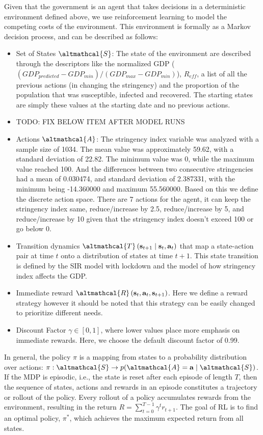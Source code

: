 \documentclass[tikz,fleqn,12pt]{wlscirep}
\begin{document}
Given that the government is an agent that takes decisions in a deterministic environment defined above, we use reinforcement learning to model the competing costs of the environment. This environment is formally as a Markov decision process, and can be described as follows:
\begin{itemize}
    \item Set of States $\altmathcal{S}$: The state of the environment are described through the descriptors like the normalized GDP ($(GDP_{predicted} - GDP_{min}) / (GDP_{max} - GDP_{min})$), $R_{eff}$, a list of all the previous actions (in changing the stringency) and the proportion of the population that was susceptible, infected and recovered. The starting states are simply these values at the starting date and no previous actions.
    \item TODO: FIX BELOW ITEM AFTER MODEL RUNS
    \item Actions $\altmathcal{A}$: The stringency index variable was analyzed with a sample size of 1034. The mean value was approximately 59.62, with a standard deviation of 22.82. The minimum value was 0, while the maximum value reached 100. And the differences between two consecutive stringencies had a mean of 0.030474, and standard deviation of 2.387331, with the minimum being -14.360000 and maximum 55.560000. Based on this we define the discrete action space. There are 7 actions for the agent, it can keep the stringency index same, reduce/increase by 2.5, reduce/increase by 5, and reduce/increase by 10 given that the stringency index doesn't exceed 100 or go below 0.
    \item Transition dynamics $\altmathcal{T}\left(\mathbf{s}_{t+1} \mid \mathbf{s}_t, \mathbf{a}_t\right)$ that map a state-action pair at time $t$ onto a distribution of states at time $t+1$. This state transition is defined by the SIR model with lockdown and the model of how stringency index affects the GDP.
    \item Immediate reward $\altmathcal{R}\left(\mathbf{s}_t, \mathbf{a}_t, \mathbf{s}_{t+1}\right)$. Here we define a reward strategy however it should be noted that this strategy can be easily changed to prioritize different needs.
    \item Discount Factor $\gamma \in[0,1]$, where lower values place more emphasis on immediate rewards. Here, we choose the default discount factor of 0.99.
\end{itemize}
In general, the policy $\pi$ is a mapping from states to a probability distribution over actions: $\pi: \altmathcal{S} \rightarrow p(\altmathcal{A}=\mathbf{a} \mid \altmathcal{S})$. If the MDP is episodic, i.e., the state is reset after each episode of length $T$, then the sequence of states, actions and rewards in an episode constitutes a trajectory or rollout of the policy. Every rollout of a policy accumulates rewards from the environment, resulting in the return $R=\sum_{t=0}^{T-1} \gamma^t r_{t+1}$. The goal of RL is to find an optimal policy, $\pi^*$, which achieves the maximum expected return from all states.
\end{document}
